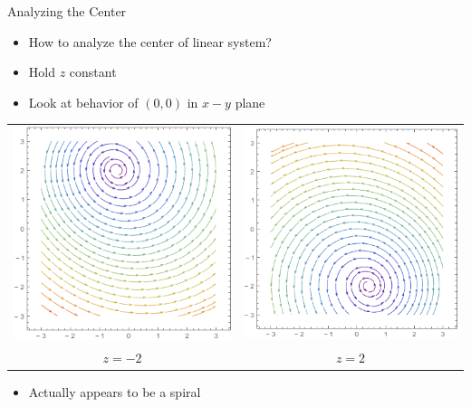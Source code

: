 \documentclass{beamer}
\begin{document}
\begin{frame}{Analyzing the Center}
	\begin{itemize}
		\item How to analyze the center of linear system?
		\pause
		\item Hold $z$ constant
		\pause
		\item Look at behavior of $(0,0)$ in $x-y$ plane
	\end{itemize}
	\begin{center}
		\begin{tabular}{c c}
			\includegraphics[scale=0.3]{spz-2} & \includegraphics[scale=0.3]{spz2}\\
			$z=-2$ & $z=2$
		\end{tabular}
	\end{center}
	\pause
	\begin{itemize}
		\item Actually appears to be a spiral
	\end{itemize}
\end{frame}
\end{document}
